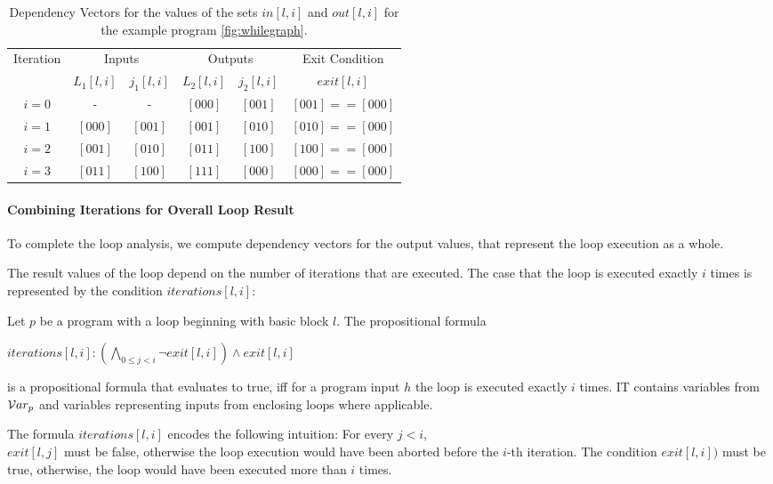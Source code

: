 \begin{table}
    \centering
    \begin{tabular}{|c|c|c|c|c|c|}
    Iteration & \multicolumn{2}{|c|}{Inputs} & \multicolumn{2}{|c|}{Outputs} & Exit Condition \\
     & $L_1[l, i]$ & $j_1[l, i]$ & $L_2[l, i]$ & $j_2[l, i]$ & $exit[l, i]$ \\
     \hline
     $i = 0$ & - & - & $[0 0 0]$ & $[0 0 1]$ & $[001] == [000]$ \\
     $i = 1$ & $[0 0 0]$ & $[0 0 1]$ & $[0 0 1]$ & $[0 1 0]$ & $[010] == [000]$ \\
     $i = 2$ & $[0 0 1]$ & $[0 1 0]$ & $[0 1 1]$ & $[1 0 0]$ & $[100] == [000]$ \\
     $i = 3$ & $[0 1 1]$ & $[1 0 0]$ & $[1 1 1]$ & $[0 0 0]$ & $[000] == [000]$ \\
    \end{tabular}
    \caption{Dependency Vectors for the values of the sets $in[l, i]$ and $out[l, i]$ for the example program \ref{fig:whilegraph}.}
    \label{tab:loop}
\end{table}

\paragraph{Combining Iterations for Overall Loop Result}
To complete the loop analysis, we compute dependency vectors for the output values, that represent the loop execution as a whole.

The result values of the loop depend on the number of iterations that are executed. The case that the loop is executed exactly $i$ times is represented by the condition $iterations[l, i]$:

\begin{definition}
    Let $p$ be a program with a loop beginning with basic block $l$.
    The propositional formula
    \begin{center}
        $iterations[l, i]: \left( \bigwedge\limits_{0 \leq j < i} \lnot exit[l, i] \right) \land exit[l, i]$
    \end{center}
    is a propositional formula that evaluates to true, iff for a program input $h$ the loop is executed exactly $i$ times. IT contains variables from $\mathcal{V}ar_p$ and variables representing inputs from enclosing loops where applicable.
\end{definition}

The formula $iterations[l, i]$ encodes the following intuition: For every $j < i$, \\$exit[l, j]$ must be false, otherwise the loop execution would have been aborted before the $i$-th iteration. The condition $exit[l, i])$ must be true, otherwise, the loop would have been executed more than $i$ times.

